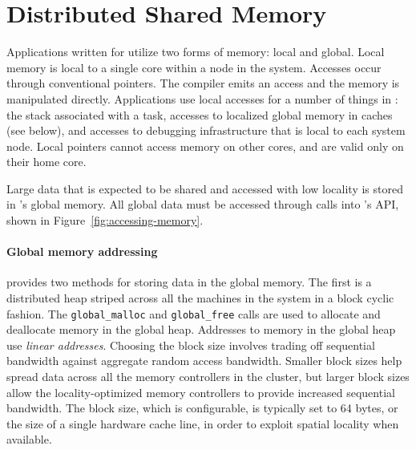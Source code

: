 \section{Distributed Shared Memory}

Applications written for \Grappa utilize two forms of memory: local and
global. Local memory is local to a single core within a node in the system.
Accesses occur through conventional pointers. The compiler emits an access and
the memory is manipulated directly. Applications use local accesses for a
number of things in \Grappa: the stack associated with a task, accesses to
localized global memory in caches (see below), and accesses to debugging
infrastructure that is local to each system node. Local pointers cannot access
memory on other cores, and are valid only on their home core.

Large data that is expected to be shared and accessed with low locality is
stored in \Grappa's global memory. All global data must be accessed through
calls into \Grappa's API, shown in Figure~\ref{fig:accessing-memory}.

\paragraph{Global memory addressing} \Grappa provides two methods for storing
data in the global memory. The first is a distributed heap striped across all
the machines in the system in a block cyclic fashion. The
\texttt{global\_malloc} and \texttt{global\_free} calls are used to allocate
and deallocate memory in the global heap. Addresses to memory in the global
heap use \emph{linear addresses}. Choosing the block size involves trading off
sequential bandwidth against aggregate random access bandwidth. Smaller block
sizes help spread data across all the memory controllers in the cluster, but
larger block sizes allow the locality-optimized memory controllers to provide
increased sequential bandwidth. The block size, which is configurable, is
typically set to 64 bytes, or the size of a single hardware cache line, in
order to exploit spatial locality when available.

